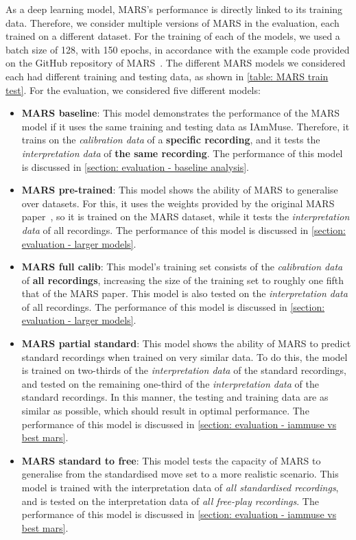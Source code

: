 As a deep learning model, MARS's performance is directly linked to its training data.
Therefore, we consider multiple versions of MARS in the evaluation, each trained on a different dataset.
For the training of each of the models, we used a batch size of 128, with 150 epochs, in accordance with the example code provided on the GitHub repository of MARS~\cite{mars2021github}.
The different MARS models we considered each had different training and testing data, as shown in \cref{table: MARS train test}.
For the evaluation, we considered five different models:
\begin{itemize}
    \item \textbf{MARS baseline}: 
        This model demonstrates the performance of the MARS model if it uses the same training and testing data as IAmMuse.
        Therefore, it trains on the \textit{calibration data} of a \textbf{specific recording}, and it tests the \textit{interpretation data} of \textbf{the same recording}.
        The performance of this model is discussed in \cref{section: evaluation - baseline analysis}.
    \item \textbf{MARS pre-trained}: 
        This model shows the ability of MARS to generalise over datasets.
        For this, it uses the weights provided by the original MARS paper~\cite{an2021mars}, so it is trained on the MARS dataset, while it tests the \textit{interpretation data} of all recordings.
        The performance of this model is discussed in \cref{section: evaluation - larger models}.
    \item \textbf{MARS full calib}: 
        This model's training set consists of the \textit{calibration data} of \textbf{all recordings}, increasing the size of the training set to roughly one fifth that of the MARS paper.
        This model is also tested on the \textit{interpretation data} of all recordings.
        The performance of this model is discussed in \cref{section: evaluation - larger models}.
    \item \textbf{MARS partial standard}: 
        This model shows the ability of MARS to predict standard recordings when trained on very similar data.
        To do this, the model is trained on two-thirds of the \textit{interpretation data} of the standard recordings, and tested on the remaining one-third of the \textit{interpretation data} of the standard recordings.
        In this manner, the testing and training data are as similar as possible, which should result in optimal performance.
        The performance of this model is discussed in \cref{section: evaluation - iammuse vs best mars}.
    \item \textbf{MARS standard to free}: 
        This model tests the capacity of MARS to generalise from the standardised move set to a more realistic scenario.
        This model is trained with the interpretation data of \textit{all standardised recordings}, and is tested on the interpretation data of \textit{all free-play recordings}.
        The performance of this model is discussed in \cref{section: evaluation - iammuse vs best mars}.
\end{itemize}

